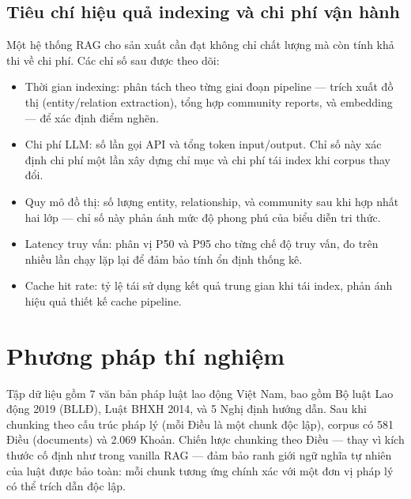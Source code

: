 \documentclass[../DoAn.tex]{subfiles}
\begin{document}
\subsection{Tiêu chí hiệu quả indexing và chi phí vận hành}
\label{subsection:4.1.3}

Một hệ thống RAG cho sản xuất cần đạt không chỉ chất lượng mà còn tính khả thi về chi phí. Các chỉ số sau được theo dõi:

\begin{itemize}[nosep, leftmargin=*]
    \item Thời gian indexing: phân tách theo từng giai đoạn pipeline — trích xuất đồ thị (entity/relation extraction), tổng hợp community reports, và embedding — để xác định điểm nghẽn.
    \item Chi phí LLM: số lần gọi API và tổng token input/output. Chỉ số này xác định chi phí một lần xây dựng chỉ mục và chi phí tái index khi corpus thay đổi.
    \item Quy mô đồ thị: số lượng entity, relationship, và community sau khi hợp nhất hai lớp — chỉ số này phản ánh mức độ phong phú của biểu diễn tri thức.
    \item Latency truy vấn: phân vị P50 và P95 cho từng chế độ truy vấn, đo trên nhiều lần chạy lặp lại để đảm bảo tính ổn định thống kê.
    \item Cache hit rate: tỷ lệ tái sử dụng kết quả trung gian khi tái index, phản ánh hiệu quả thiết kế cache pipeline.
\end{itemize}

\section{Phương pháp thí nghiệm}
\label{section:4.2}


Tập dữ liệu gồm 7 văn bản pháp luật lao động Việt Nam, bao gồm Bộ luật Lao động 2019 (BLLĐ), Luật BHXH 2014, và 5 Nghị định hướng dẫn. Sau khi chunking theo cấu trúc pháp lý (mỗi Điều là một chunk độc lập), corpus có 581 Điều (documents) và 2.069 Khoản. Chiến lược chunking theo Điều — thay vì kích thước cố định như trong vanilla RAG — đảm bảo ranh giới ngữ nghĩa tự nhiên của luật được bảo toàn: mỗi chunk tương ứng chính xác với một đơn vị pháp lý có thể trích dẫn độc lập.
\end{document}
